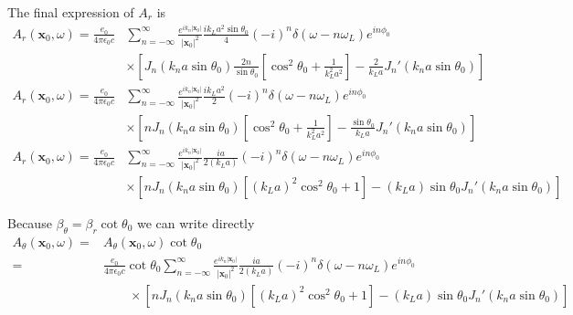 The final expression of $A_r$ is
\begin{align}
    A_r({\bm x}_0,\omega)=\frac{e_0 }{4\pi\epsilon_0 c} & \sum_{n=-\infty}^{\infty}\frac{e^{i k_n|{\bm x}_0|}}{|{\bm x}_0|^2}\frac{ik_La^2\sin\theta_0}4 (-i)^n \delta(\omega-n\omega_L)e^{in\phi_0}\nonumber \\
                                                        & \times\left[J_n(k_na\sin\theta_0)\frac{2n}{\sin\theta_0}\left[\cos^2\theta_0+\frac1{k_L^2a^2}\right]-\frac{2}{k_La}J_n'(k_na\sin\theta_0)\right]
\end{align}
\begin{align}
    A_r({\bm x}_0,\omega)=\frac{e_0 }{4\pi\epsilon_0 c} & \sum_{n=-\infty}^{\infty}\frac{e^{i k_n|{\bm x}_0|}}{|{\bm x}_0|^2}\frac{ik_La^2}2 (-i)^n \delta(\omega-n\omega_L)e^{in\phi_0}\nonumber \\
                                                        & \times\left[nJ_n(k_na\sin\theta_0)\left[\cos^2\theta_0+\frac1{k_L^2a^2}\right]-\frac{\sin\theta_0}{k_La}J_n'(k_na\sin\theta_0)\right]
\end{align}
\begin{align}
    A_r({\bm x}_0,\omega)=\frac{e_0 }{4\pi\epsilon_0 c} & \sum_{n=-\infty}^{\infty}\frac{e^{i k_n|{\bm x}_0|}}{|{\bm x}_0|^2}\frac{ia}{2(k_La)} (-i)^n \delta(\omega-n\omega_L)e^{in\phi_0}\nonumber \\
                                                        & \times\left[nJ_n(k_na\sin\theta_0)\left[(k_La)^2\cos^2\theta_0+1\right]-(k_La){\sin\theta_0}J_n'(k_na\sin\theta_0)\right]
\end{align}


Because $\beta_\theta=\beta_r \cot\theta_0$ we can write directly
\begin{align}
    A_\theta({\bm x}_0,\omega)= & A_\theta({\bm x}_0,\omega)\cot\theta_0\nonumber                                                                                                                                                                                                                                   \\
    =                           & \frac{e_0 }{4\pi\epsilon_0 c}\cot\theta_0                                                                                              \sum_{n=-\infty}^{\infty}\frac{e^{i k_n|{\bm x}_0|}}{|{\bm x}_0|^2}\frac{ia}{2(k_La)} (-i)^n \delta(\omega-n\omega_L)e^{in\phi_0}\nonumber \\
                                & \qquad\times\left[nJ_n(k_na\sin\theta_0)\left[(k_La)^2\cos^2\theta_0+1\right]-(k_La){\sin\theta_0}J_n'(k_na\sin\theta_0)\right]
\end{align}


